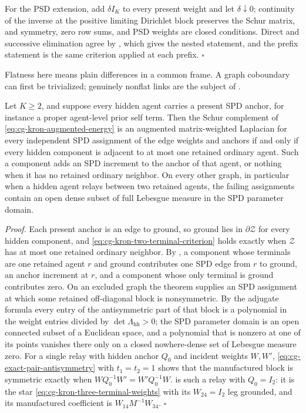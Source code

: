 For the PSD extension, add \(\delta I_K\) to every present weight and let
\(\delta\downarrow0\); continuity of the inverse at the positive limiting
Dirichlet block preserves the Schur matrix, and symmetry, zero row sums, and
PSD weights are closed conditions. Direct and successive elimination agree by
, which gives the nested statement, and
the prefix statement is the same criterion applied at each prefix. \(\square\)

Flatness here means plain differences in a common frame. A graph coboundary can
first be trivialized; genuinely nonflat links are the subject of
.

Let \(K\geq2\), and suppose every hidden agent carries a present SPD anchor,
for instance a proper agent-level prior self term. Then the Schur complement of
\eqref{eq:cg-kron-augmented-energy} is an augmented matrix-weighted Laplacian
for every independent SPD assignment of the edge weights and anchors if and only
if every hidden component is adjacent to at most one retained ordinary agent.
Such a component adds an SPD increment to the anchor of that agent, or nothing
when it has no retained ordinary neighbor. On every other graph, in particular
when a hidden agent relays between two retained agents, the failing assignments
contain an open dense subset of full Lebesgue measure in the SPD parameter
domain. 

\noindent\emph{Proof.}
Each present anchor is an edge to ground, so ground lies in
\(\partial\mathcal Z\) for every hidden component, and
\eqref{eq:cg-kron-two-terminal-criterion} holds exactly when \(\mathcal Z\) has
at most one retained ordinary neighbor. By
, a component whose terminals are one
retained agent \(r\) and ground contributes one SPD edge from \(r\) to ground,
an anchor increment at \(r\), and a component whose only terminal is ground
contributes zero. On an excluded graph the theorem supplies an SPD assignment
at which some retained off-diagonal block is nonsymmetric. By the adjugate
formula every entry of the antisymmetric part of that block is a polynomial in
the weight entries divided by \(\det\Lambda_{\mathrm{hh}}>0\); the SPD parameter
domain is an open connected subset of a Euclidean space, and a polynomial that
is nonzero at one of its points vanishes there only on a closed nowhere-dense
set of Lebesgue measure zero. For a single relay with hidden anchor \(Q_0\) and
incident weights \(W,W'\), \eqref{eq:cg-exact-pair-antisymmetry} with
\(t_1=t_2=1\) shows that the manufactured block is symmetric exactly when
\(WQ_0^{-1}W'=W'Q_0^{-1}W\).  is such a relay
with \(Q_0=I_2\): it is the star \eqref{eq:cg-kron-three-terminal-weights} with
its \(W_{24}=I_2\) leg grounded, and its manufactured coefficient is
\(W_{14}M^{-1}W_{34}\). \(\square\)

